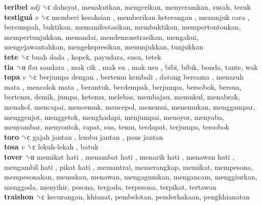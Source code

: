 \textbf{teribel} \emph{adj}  ␝ϲ  dahsyat, menakutkan, mengerikan, menyeramkan, susah, teruk  \\
\textbf{testiguá} \emph{v}  ␝ϲ   memberi kesaksian ,  memberikan keterangan ,  menunjuk cara , bersumpah, buktikan, memanifestasikan, membuktikan, mempertontonkan, mempertunjukkan, menandai, mendemonstrasikan, mengakui, mengejawantahkan, mengekspresikan, menunjukkan, tunjukkan  \\
\textbf{tete} ␝ϲ   buah dada , kopek, payudara, susu, tetek  \\
\textbf{tia} ␝α   ibu saudara ,  mak cik ,  mak su ,  mak usu , bibi, bibik, bonda, tante, wak  \\
\textbf{topa} \emph{v}  ␝ϲ   berjumpa dengan ,  bertemu kembali ,  datang bersama ,  menaruh mata ,  mencolok mata , berantuk, berdempak, berjumpa, bersobok, bersua, bertemu, demik, jumpa, ketemu, melebas, membajau, memukul, menabrak, menakol, mencapai, mencemuk, mencepol, menemui, menemukan, menggampar, menggenjot, menggetok, menghadapi, menjumpai, menoyor, menyaba, menyambar, menyontok, rapat, sua, temu, terdapat, terjumpa, tersobok  \\
\textbf{toro} ␝ϲ   gajah jantan ,  lembu jantan ,  paus jantan   \\
\textbf{tosa} \emph{v}  ␝ϲ   lekuh-lekah , batuk  \\
\textbf{tover} ␝α   memikat hati ,  menambat hati ,  menarik hati ,  menawan hati ,  mengambil hati ,  pikat hati , memantrai, memerangkap, memikat, mempesona, mempesonakan, memukau, menawan, mengagumkan, mengancam, menggiurkan, menggoda, menyihir, pesona, tergoda, terpesona, terpikat, tertawan  \\
\textbf{traishon} ␝ϲ  kecurangan, khianat, pembelotan, penderhakaan, pengkhianatan  \\
